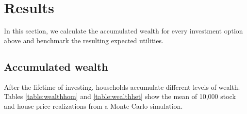 \chapter{Results}
\label{welfare}

In this section, we calculate the accumulated wealth for every investment option above and benchmark the resulting expected utilities.

\section{Accumulated wealth}

After the lifetime of investing, households accumulate different levels of wealth. Tables \ref{table:wealthhom} and \ref{table:wealthhet} show the mean of 10,000 stock and house price realizations from a Monte Carlo simulation.

